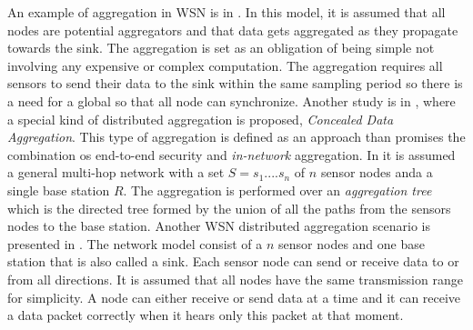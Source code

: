 An example of  aggregation in WSN is in  \cite{castelluccia2005efficient}. In this model, it is assumed that all nodes are potential aggregators and that data gets aggregated as they propagate towards the sink. The aggregation is set as an obligation of being simple not involving any expensive or complex computation. The aggregation requires all sensors to send their data to the sink within the same sampling period so there is a need for a global so that all node can synchronize. Another study is in \cite{Girao2004c}, where a special kind of distributed aggregation is proposed, \textit{Concealed Data Aggregation}. This type of aggregation is defined as an approach than promises the combination os end-to-end security and \textit{in-network} aggregation. In \cite{chan2006secure} it is assumed a general multi-hop network with a set $S={s_1....s_n}$ of $n$ sensor nodes anda a single base station $R$. The aggregation is performed over an \textit{aggregation tree} which is the directed tree formed by the union of all the paths from the sensors nodes to the base station. Another WSN distributed aggregation scenario is presented in \cite{yu2009distributed}. The network model consist of a $n$ sensor nodes and one base station that is also called a sink. Each sensor node can send or receive data to or from all directions. It is assumed that all nodes have the same transmission range for simplicity. A node can either receive or send data at a time and it can receive a data packet correctly when it hears only this packet at that moment.


